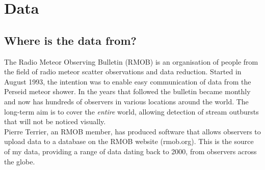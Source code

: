 \chapter{Data}
\label{chap:data}
\section{Where is the data from?}
The Radio Meteor Observing Bulletin (RMOB) \cite{rmob} is an organisation of people from the field of radio meteor scatter observations and data reduction. Started in August 1993, the intention was to enable easy communication of data from the Perseid meteor shower. In the years that followed the bulletin became monthly and now has hundreds of observers in various locations around the world. The long-term aim is to cover the {\it entire} world, allowing detection of stream outbursts that will not be noticed visually.\\
Pierre Terrier, an RMOB member, has produced software that allows observers to upload data to a database on the RMOB website (rmob.org). This is the source of my data, providing a range of data dating back to 2000, from observers across the globe.
